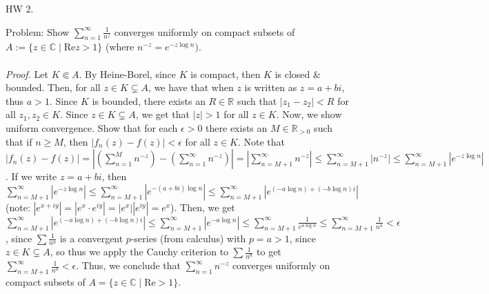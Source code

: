 \documentclass[12pt]{article}
\theoremstyle{definition}
\theoremstyle{named}
\begin{document}
\begin{center}
    HW 2.  
\end{center}

Problem: Show $\sum_{n=1}^{\infty} \frac{1}{n^z}$ converges uniformly on compact subsets of $A := \{z \in \mathbb{C} \mid \textrm{Re}z>1\}$ (where $n^{-z} = e^{-z\log n})$. 
\\ \\
\textit{Proof. } Let $K \Subset A$. By Heine-Borel, since $K$ is compact, then $K$ is closed \& bounded. Then, for all $z \in K \subsetneq A$, we have that when $z$ is written as $z=a+bi$, thus $a > 1$. Since $K$ is bounded, there exists an $R \in \mathbb{R}$ such that $|z_1 - z_2| < R$ for all $z_1,z_2 \in K$. Since $z \in K \subsetneq A$, we get that $|z| > 1$ for all $z \in K$. Now, we show uniform convergence. Show that for each $\epsilon > 0$ there exists an $M \in \mathbb{R}_{>0}$ such that if $n \geq M$, then $|f_n(z) - f(z)| < \epsilon$ for all $z \in K$. Note that $|f_n(z) - f(z)| = \left|\left(\sum_{n=1}^{M} n^{-z}\right) - \left(\sum_{n=1}^{\infty}n^{-z}\right)\right| = \left|\sum_{n=M+1}^{\infty} n^{-z}\right| \leq \sum_{n=M+1}^{\infty} |n^{-z}| \leq \sum_{n=M+1}^{\infty} |e^{-z\log n}|$. If we write $z=a+bi$, then $\sum_{n=M+1}^{\infty} |e^{-z\log n}| \leq \sum_{n=M+1}^{\infty} |e^{-(a+bi)\log n}| \leq \sum_{n=M+1}^{\infty} |e^{(-a\log n) + (-b\log n)i}|$ (note: $|e^{x+iy}| = |e^x \cdot e^{iy}| = |e^x| |e^{iy}| = e^x$). Then, we get $\sum_{n=M+1}^{\infty} |e^{(-a\log n) + (-b\log n)i}| \leq \sum_{n=M+1}^{\infty} |e^{-a\log n}| \leq \sum_{n=M+1}^{\infty} \frac{1}{e^{a\log n}} \leq \sum_{n=M+1}^{\infty} \frac{1}{n^a} < \epsilon$, since $\sum \frac{1}{n^a}$ is a convergent $p$-series (from calculus) with $p=a>1$, since $z \in K \subsetneq A$, so thus we apply the Cauchy criterion to $\sum \frac{1}{n^a}$ to get $\sum_{n=M+1}^{\infty} \frac{1}{n^a} < \epsilon$. Thus, we conclude that $\sum_{n=1}^{\infty} n^{-z}$ converges uniformly on compact subsets of $A = \{z \in \mathbb{C} \mid \textrm{Re} > 1\}$.  
\end{document}
